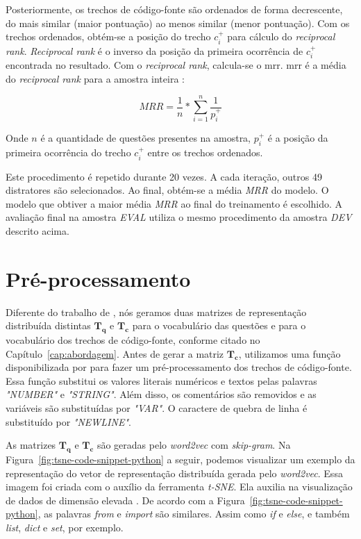 Posteriormente, os trechos de código-fonte são ordenados de forma decrescente, do mais similar (maior pontuação) ao menos similar (menor pontuação). Com os trechos ordenados, obtém-se a posição do trecho $c_{i}^{+}$ para cálculo do \textit{reciprocal rank}. \textit{Reciprocal rank} é o inverso da posição da primeira ocorrência de $c_{i}^{+}$ encontrada no resultado. Com o \textit{reciprocal rank}, calcula-se o \acrshort{mrr}. \acrshort{mrr} é a média do \textit{reciprocal rank} para a amostra inteira \citep{Gu-deep-code-search:2018}:

\begin{equation}
MRR = \frac{1}{n} * \sum_{i = 1}^{n}\frac{1}{p_{i}^{+}}    
\end{equation}

Onde $n$ é a quantidade de questões presentes na amostra, $p_{i}^{+}$ é a posição da primeira ocorrência do trecho $c_{i}^{+}$ entre os trechos ordenados.

Este procedimento é repetido durante 20 vezes. A cada iteração, outros 49 distratores são selecionados. Ao final, obtém-se a média \emph{MRR} do modelo. O modelo que obtiver a maior média \emph{MRR} ao final do treinamento é escolhido. A avaliação final na amostra \emph{EVAL} utiliza o mesmo procedimento da amostra \emph{DEV} descrito acima.

\section{Pré-processamento}
\label{sec:pre-processamento}

Diferente do trabalho de \cite{tan-lstm-qa}, nós geramos duas matrizes de representação distribuída distintas $\bm{T_{q}}$ e $\bm{T_{c}}$ para o vocabulário das questões e para o vocabulário dos trechos de código-fonte, conforme citado no Capítulo~\ref{cap:abordagem}. Antes de gerar a matriz $\bm{T_{c}}$, utilizamos uma função disponibilizada por \cite{yao-2018} para fazer um pré-processamento dos trechos de código-fonte. Essa função substitui os valores literais numéricos e textos pelas palavras \emph{"NUMBER"} e \emph{"STRING"}. Além disso, os comentários são removidos e as variáveis são substituídas por \emph{"VAR"}. O caractere de quebra de linha é substituído por \emph{"NEWLINE"}.

As matrizes $\bm{T_{q}}$ e $\bm{T_{c}}$ são geradas pelo \textit{word2vec} com \textit{skip-gram}. Na Figura~\ref{fig:tsne-code-snippet-python} a seguir, podemos visualizar um exemplo da representação do vetor de representação distribuída gerada pelo \textit{word2vec}. Essa imagem foi criada com o auxílio da ferramenta \textit{t-SNE}. Ela auxilia na visualização de dados de dimensão elevada \citep{scikit-learn-tsne-2019, quora-tsne-2019}. De acordo com a Figura~\ref{fig:tsne-code-snippet-python}, as palavras \emph{from} e \emph{import} são similares. Assim como \emph{if} e \emph{else}, e também \emph{list}, \emph{dict} e \emph{set}, por exemplo.

